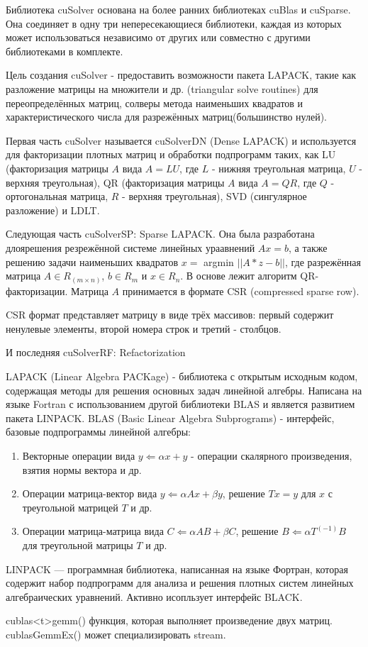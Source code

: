 \documentclass[a4paper,14pt,russian]{extreport}
\begin{document}
Библиотека cuSolver основана на более ранних библиотеках cuBlas и cuSparse. Она соединяет в одну три непересекающиеся библиотеки, каждая из которых может использоваться независимо от других или совместно с другими библиотеками в комплекте. 
\par
Цель создания cuSolver - предоставить возможности пакета LAPACK, такие как разложение матрицы на множители и др. (triangular solve routines) для переопределённых матриц, солверы метода наименьших квадратов и характеристического числа для разрежённых матриц(большинство нулей). 
\par
Первая часть cuSolver называется cuSolverDN (Dense LAPACK) и используется для факторизации плотных матриц  и обработки подпрограмм таких, как LU (факторизация матрицы $A$ вида $A = LU$, где $L$ - нижняя треугольная матрица, $U$ - верхняя треугольная), QR (факторизация матрицы $A$ вида $A = QR$, где $Q$ - ортогональная матрица, $R$ - верхняя треугольная), SVD (сингулярное разложение) и LDLT.
\par
Следующая часть cuSolverSP: Sparse LAPACK. Она была разработана длоярешения резрежённой системе линейных ураавнений $Ax=b$, а также решению задачи наименьших квадратов $x = $ argmin $||A*z-b||$, где разрежённая матрица $A \in R_(m\times n)$, $b \in R_m$ и $x\in R_n$. В основе лежит алгоритм QR-факторизации. Матрица $A$ принимается в формате CSR (compressed sparse row). 
\par
CSR формат представляет матрицу в виде трёх массивов: первый содержит ненулевые элементы, второй номера строк и третий - столбцов. 
\par
И последняя cuSolverRF: Refactorization
\par
LAPACK (Linear Algebra PACKage) - библиотека с открытым исходным кодом, содержащая методы для решения основных задач линейной алгебры. Написана на языке Fortran с использованием другой библиотеки BLAS и является развитием пакета LINPACK.
BLAS (Basic Linear Algebra Subprograms) - интерфейс, базовые подпрограммы линейной алгебры:
\begin{enumerate}
\item Векторные операции вида $y\Leftarrow\alpha x + y$ - операции скалярного произведения, взятия нормы вектора и др.
\item Операции матрица-вектор вида $y\Leftarrow\alpha Ax + \beta y$, решение $Tx = y$ для $x$ с треугольной матрицей $T$ и др.
\item Операции матрица-матрица вида $C\Leftarrow \alpha AB + \beta C$, решение $B\Leftarrow \alpha T^(-1)B$ для треугольной матрицы $T$ и др.
\end{enumerate}
LINPACK — программная библиотека, написанная на языке Фортран, которая содержит набор подпрограмм для анализа и решения плотных систем линейных алгебраических уравнений. Активно исопльзует интерфейс BLACK.
\par
cublas<t>gemm() функция, которая выполняет произведение двух матриц. cublasGemmEx() может специализировать stream.
\par
\end{document}
